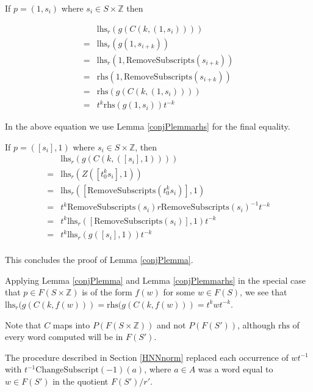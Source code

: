\documentclass[12pt]{article} %
\theoremstyle{definition}
\theoremstyle{definition}
\theoremstyle{definition}
\theoremstyle{definition}
\begin{document}
If $p = (1, s_i)$ where $s_i \in S \times \mathbb{Z}$ then

\begin{equation}
  \begin{aligned}
  & \text{lhs}_{r}(g(C(k, (1, s_i)))) \\
  = & \text{lhs}_r(g(1, s_{i + k})) \\
  = & \text{lhs}_r(1, \text{RemoveSubscripts}(s_{i + k})) \\
  = & \text{rhs}(1, \text{RemoveSubscripts}(s_{i + k})) \\
  = & \text{rhs}(g(C(k, (1, s_i)))) \\
  = & t^k \text{rhs}(g(1, s_i)) t^{-k}
  \end{aligned}
\end{equation}

In the above equation we use Lemma \ref{conjPlemmarhs} for the final equality.

If $p = ([s_i], 1)$ where $s_i \in S \times \mathbb{Z}$, then
\begin{equation}
  \begin{aligned}
    & \text{lhs}_{r}(g(C(k, ([s_i], 1)))) \\
  = & \text{lhs}_r(Z([t_0^ks_i], 1)) \\
  = & \text{lhs}_r([\text{RemoveSubscripts}(t_0^ks_i)], 1) \\
  = & t^k \text{RemoveSubscripts}(s_i)r\text{RemoveSubscripts}(s_i)^{-1} t^{-k} \\
  = & t^k \text{lhs}_r([\text{RemoveSubscripts}(s_i)], 1) t^{-k} \\
  = & t^k \text{lhs}_r(g([s_i],1)) t^{-k} \\
  \end{aligned}
\end{equation}

This concludes the proof of Lemma \ref{conjPlemma}.

Applying Lemma \ref{conjPlemma} and Lemma \ref{conjPlemmarhs} in the special
case that $p \in F(S \times \mathbb{Z})$ is of the form $f(w)$ for some $w \in F(S)$,
we see that $\text{lhs}_r(g(C(k, f(w))) = \text{rhs}(g(C(k, f(w))) = t^k w t^{-k}$.

Note that $C$ maps into $P(F(S \times \mathbb{Z}))$
and not $P(F(S'))$, although $\text{rhs}$ of every word computed
will be in $F(S')$.

The procedure described in Section \ref{HNNnorm}
replaced each occurrence of $wt^{-1}$ with \newline $t^{-1}\text{ChangeSubscript}(-1)(a)$,
where $a \in A$ was a word equal to $w \in F(S')$ in the quotient $F(S') / r'$.
\end{document}
